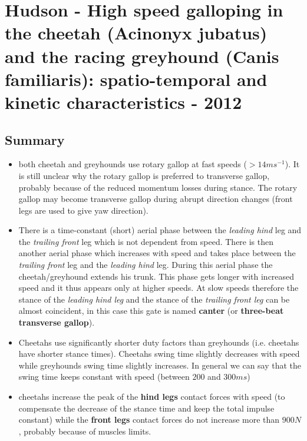 \section{Hudson - High speed galloping in the cheetah (Acinonyx jubatus) and the racing greyhound (Canis familiaris): spatio-temporal and kinetic characteristics - 2012}


\subsection*{Summary}

\begin{itemize}
\item both cheetah and greyhounds use rotary gallop at fast speeds ($>14 m s^{-1}$). It is still unclear why the rotary gallop is preferred to transverse gallop, probably because of the reduced momentum losses during stance. The rotary gallop may become transverse gallop during abrupt direction changes (front legs are used to give yaw direction). 

\item There is a time-constant (short) aerial phase between the \textit{leading hind} leg and the \textit{trailing front} leg which is not dependent from speed. There is then another aerial phase which increases with speed and takes place between the \textit{trailing front} leg and the \textit{leading hind} leg. During this aerial phase the cheetah/greyhound extends his trunk. This phase gets longer with increased speed and it thus appears only at higher speeds. At slow speeds therefore the stance of the \textit{leading hind leg} and the stance of the \textit{trailing front leg} can be almost coincident, in this case this gate is named \textbf{canter} (or \textbf{three-beat transverse gallop}).

\item Cheetahs use significantly shorter duty factors than greyhounds (i.e. cheetahs have shorter stance times).  Cheetahs swing time slightly decreases with speed while greyhounds swing time slightly increases. In general we can say that the swing time keeps constant with speed (between $200$ and $300 ms$)

\item cheetahs increase the peak of the \textbf{hind legs} contact forces with speed (to compensate the decrease of the stance time and keep the total impulse constant) while the \textbf{front legs} contact forces do not increase more than $900N$, probably because of muscles limits.


\end{itemize}
